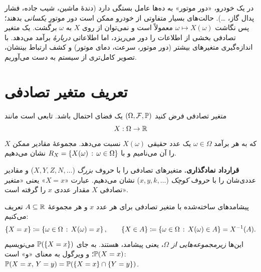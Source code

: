 \begin{intuition}
در یک خودرو، «دور موتور» به ده‌ها عامل بستگی دارد (دندهٔ ماشین، شیب جاده، فشار پدال گاز، \dots). حالت‌های بسیار متفاوتی از خودرو ممکن است دور موتورِ \emph{یکسانی} بدهند؛ پس نگاشت $\omega\mapsto X(\omega)$ معمولاً  است و نمی‌توان از روی $X$ به $\omega$ برگشت. یک متغیر تصادفی بخشی از اطلاعات را دور می‌ریزد، اما اطلاعاتی \emph{دربارهٔ} برآمد می‌دهد. با اندازه‌گیری متغیرهای بیشتر (دور موتور، سرعت، دمای موتور) و کشف ارتباط بینشان، تصویر کامل‌تری از سیستم به دست می‌آوریم.
\end{intuition}

\section{تعریف متغیر تصادفی}

\begin{definition}[label=def:rv]{متغیر تصادفی}
فرض کنید $(\Omega,\F,\P)$ یک فضای احتمال باشد.  تابعی است مانند
\[ X:\Omega\to\R \]
که به هر برآمد $\omega\in\Omega$ یک عدد حقیقی $X(\omega)$ نسبت می‌دهد. مجموعهٔ مقادیر ممکن $X$ را  آن می‌نامیم و با $R_X=\setc{X(\omega)}{\omega\in\Omega}$ نشان می‌دهیم.
\end{definition}

\begin{note}
\textbf{قرارداد نمادگذاری.} متغیرهای تصادفی را با حروف \emph{بزرگ} ($X,Y,Z,N,\dots$) و مقادیر عددی‌شان را با حروف \emph{کوچک} ($x,y,k,\dots$) نشان می‌دهیم. عبارت «$X=x$» یعنی «متغیر تصادفی $X$ مقدار عددی $x$ را گرفته است».
\end{note}

\begin{definition}[label=def:rv-events]{پیشامدهای ساخته‌شده با متغیر تصادفی}
برای هر عدد $x$ و هر مجموعهٔ $A\subseteq\R$ تعریف می‌کنیم:
\[ \{X=x\}\defeq\setc{\omega\in\Omega}{X(\omega)=x},\qquad \{X\in A\}\defeq\setc{\omega\in\Omega}{X(\omega)\in A}=X^{-1}(A). \]
این‌ها \emph{زیرمجموعه‌هایی از $\Omega$}، یعنی پیشامد، هستند. به جای $\P(\{X=x\})$ می‌نویسیم $\P(X=x)$؛ و ویرگول به معنای «و» است: $\P(X=x,\,Y=y)=\P(\{X=x\}\cap\{Y=y\})$.
\end{definition}

